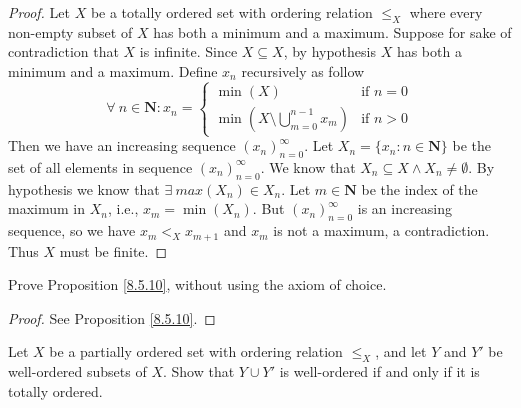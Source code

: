 \begin{proof}
    Let \(X\) be a totally ordered set with ordering relation \(\leq_X\) where every non-empty subset of \(X\) has both a minimum and a maximum.
    Suppose for sake of contradiction that \(X\) is infinite.
    Since \(X \subseteq X\), by hypothesis \(X\) has both a minimum and a maximum.
    Define \(x_n\) recursively as follow
    \[
        \forall\ n \in \mathbf{N} : x_n = \begin{cases}
            \min(X)                                       & \text{if } n = 0 \\
            \min(X \setminus \bigcup_{m = 0}^{n - 1} x_m) & \text{if } n > 0
        \end{cases}
    \]
    Then we have an increasing sequence \((x_n)_{n = 0}^\infty\).
    Let \(X_n = \{x_n : n \in \mathbf{N}\}\) be the set of all elements in sequence \((x_n)_{n = 0}^\infty\).
    We know that \(X_n \subseteq X \land X_n \neq \emptyset\).
    By hypothesis we know that \(\exists\ max(X_n) \in X_n\).
    Let \(m \in \mathbf{N}\) be the index of the maximum in \(X_n\), i.e., \(x_m = \min(X_n)\).
    But \((x_n)_{n = 0}^\infty\) is an increasing sequence, so we have \(x_m <_X x_{m + 1}\) and \(x_m\) is not a maximum, a contradiction.
    Thus \(X\) must be finite.
\end{proof}

\begin{exercise}\label{ex 8.5.10}
    Prove Proposition \ref{8.5.10}, without using the axiom of choice.
\end{exercise}

\begin{proof}
    See Proposition \ref{8.5.10}.
\end{proof}

\begin{exercise}\label{ex 8.5.11}
    Let \(X\) be a partially ordered set with ordering relation \(\leq_X\), and let \(Y\) and \(Y'\) be well-ordered subsets of \(X\).
    Show that \(Y \cup Y'\) is well-ordered if and only if it is totally ordered.
\end{exercise}

